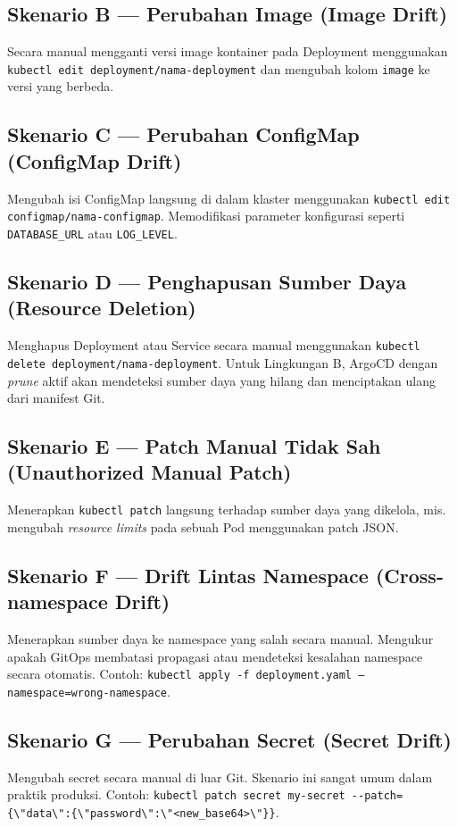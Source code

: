 \subsection{Skenario B --- Perubahan Image (Image Drift)}
Secara manual mengganti versi image kontainer pada Deployment menggunakan \texttt{kubectl edit deployment/nama-deployment} dan mengubah kolom \texttt{image} ke versi yang berbeda.

\subsection{Skenario C --- Perubahan ConfigMap (ConfigMap Drift)}
Mengubah isi ConfigMap langsung di dalam klaster menggunakan \texttt{kubectl edit configmap/nama-configmap}. Memodifikasi parameter konfigurasi seperti \texttt{DATABASE\_URL} atau \texttt{LOG\_LEVEL}.

\subsection{Skenario D --- Penghapusan Sumber Daya (Resource Deletion)}
Menghapus Deployment atau Service secara manual menggunakan \texttt{kubectl delete deployment/nama-deployment}. Untuk Lingkungan B, ArgoCD dengan \textit{prune} aktif akan mendeteksi sumber daya yang hilang dan menciptakan ulang dari manifest Git.

\subsection{Skenario E --- Patch Manual Tidak Sah (Unauthorized Manual Patch)}
Menerapkan \texttt{kubectl patch} langsung terhadap sumber daya yang dikelola, mis. mengubah \textit{resource limits} pada sebuah Pod menggunakan patch JSON.

\subsection{Skenario F --- Drift Lintas Namespace (Cross-namespace Drift)}
Menerapkan sumber daya ke namespace yang salah secara manual. Mengukur apakah GitOps membatasi propagasi atau mendeteksi kesalahan namespace secara otomatis. Contoh: \texttt{kubectl apply -f deployment.yaml --namespace=wrong-namespace}.

\subsection{Skenario G --- Perubahan Secret (Secret Drift)}
Mengubah secret secara manual di luar Git. Skenario ini sangat umum dalam praktik produksi. Contoh: \verb|kubectl patch secret my-secret --patch={\"data\":{\"password\":\"<new_base64>\"}}|.

